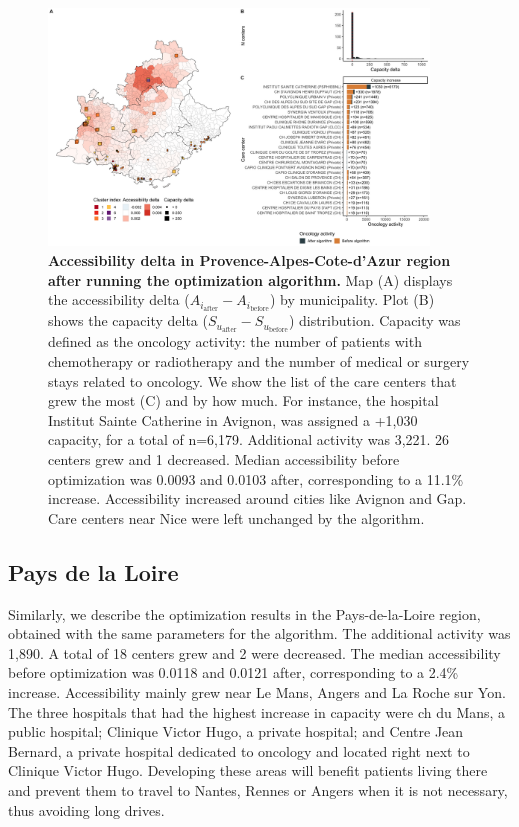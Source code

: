 \begin{figure}[H]
    \includegraphics[width=0.9\textwidth]{images/camion/fig5_Provence-Alpes-Cote-d'Azur.png}
    \centering
    \caption{ \textbf{Accessibility delta in Provence-Alpes-Cote-d'Azur region
        after running the optimization algorithm.} Map (A) displays the
    accessibility delta ($A_{i_\text{after}} - A_{i_\text{before}}$) by
    municipality. Plot (B) shows the capacity delta
    ($S_{u_\text{after}}-S_{u_\text{before}}$) distribution. Capacity was
    defined as the oncology activity: the number of patients with
    chemotherapy or radiotherapy and the number of medical or surgery stays
    related to oncology. We show the list of the care centers that grew the
    most (C)  and by how much. For instance, the hospital Institut Sainte
    Catherine in Avignon, was assigned a +1,030 capacity, for a total of
    n=6,179. Additional activity was 3,221. 26 centers grew and 1 decreased.
    Median accessibility before optimization was 0.0093 and 0.0103 after,
    corresponding to a 11.1\% increase.  Accessibility increased around
    cities like Avignon and Gap. Care centers near Nice were left unchanged
    by the algorithm. }
    \label{fig:optim-paca}
\end{figure}

\subsection*{Pays de la Loire}

Similarly, we describe the optimization results in the Pays-de-la-Loire region,
obtained with the same parameters for the algorithm. The additional activity was
1,890. A total of 18 centers grew and 2 were decreased. The median accessibility
before optimization was 0.0118 and 0.0121 after, corresponding to a 2.4\%
increase. Accessibility mainly grew near Le Mans, Angers and La Roche sur Yon.
The three hospitals that had the highest increase in capacity were \ac{ch}
du Mans, a public hospital; Clinique Victor Hugo, a private hospital; and
Centre Jean Bernard, a private hospital dedicated to oncology and located
right next to Clinique Victor Hugo. Developing these areas will benefit patients
living there and prevent them to travel to Nantes, Rennes or Angers when it is
not necessary, thus avoiding long drives.

